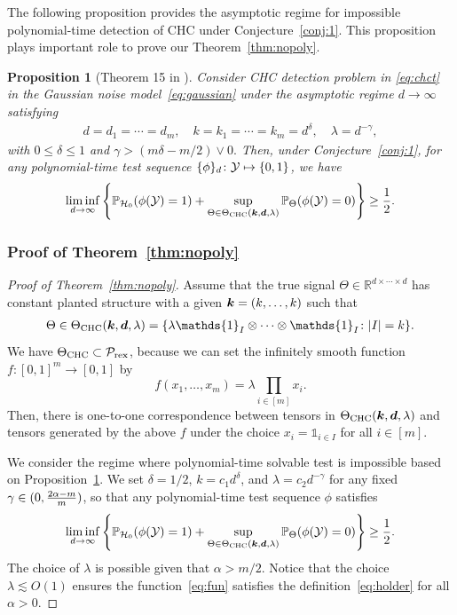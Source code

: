 \documentclass[12pt]{article}
\newtheorem{prop}{Proposition}
\theoremstyle{definition}
\begin{document}
{The following proposition provides the asymptotic regime for impossible polynomial-time detection of CHC under Conjecture~\ref{conj:1}. This proposition plays important role to prove our Theorem~\ref{thm:nopoly}.
 \begin{prop}[Theorem 15 in \citep{luo2022tensor}]\label{prop:CHC} 
Consider CHC detection problem in \eqref{eq:chct} in the Gaussian noise model~\eqref{eq:gaussian} under the asymptotic regime $d\rightarrow\infty$ satisfying
\begin{align}\label{eq:equal}
  d =  d_1= \cdots= d_m ,\quad
    k = k_1 = \cdots = k_m = d^\delta,\quad \lambda  = d^{-\gamma},
\end{align}with $0\leq\delta\leq1$ and $\gamma >(m\delta-m/2)\vee 0.$ Then, under Conjecture~\ref{conj:1}, for any polynomial-time test sequence $\{\phi\}_d\colon \mathcal{Y}\mapsto\{0,1\}$, we have
\begin{align}
    \liminf_{d\rightarrow\infty} \left\{\mathbb{P}_{\mathcal{H}_0}(\phi(\mathcal{Y}) = 1)+ \sup_{\Theta\in\Theta_{\textup{CHC}}(\bm{k},\bm{d},\lambda)}\mathbb{P}_{\Theta}(\phi(\mathcal{Y}) =0) \right\}\geq\frac{1}{2}.
\end{align}
\end{prop}
 
\subsubsection{Proof of Theorem~\ref{thm:nopoly}}
 \begin{proof}[Proof of Theorem~\ref{thm:nopoly}]
 Assume that  the true signal $\Theta\in\mathbb{R}^{d\times \cdots \times d}$ has constant planted structure with a given $\bm{k}=(k,\ldots,k)$ such that 
\begin{align}
    \Theta \in\Theta_{\text{CHC}}(\mk,\md,\lambda) = \{ \lambda \mathds{1}_{I}\otimes \cdots\otimes \mathds{1}_{I}\colon  |I| = k\}.
\end{align}
We have $\Theta_{\text{CHC}}\subset \mathcal{P}_{\textup{rex}}$, because we can set the infinitely smooth function $f: [0,1]^m \to[0,1]$ by
\begin{equation}\label{eq:fun}
f(x_1,\ldots,x_m)=\lambda \prod_{i\in[m]}x_i.
\end{equation}
Then, there is one-to-one correspondence between tensors in $\Theta_{\textup{CHC}}(\bm{k},\bm{d},\lambda)$ and tensors generated by the above $f$ under the choice $x_i=\mathds{1}_{i\in I}$ for all $i\in[m]$.


We consider the regime where polynomial-time solvable test is impossible based on Proposition~\ref{prop:CHC}. We set $\delta=1/2$, $k = c_1d^{\delta}$, and $\lambda = c_2d^{-\gamma}$ for any fixed $\gamma \in (0, {2\alpha -m \over m})$, so that any polynomial-time test sequence $\phi$ satisfies 
\[
 \liminf_{d\rightarrow\infty} \left\{\mathbb{P}_{\mathcal{H}_0}(\phi(\mathcal{Y}) = 1)+\sup_{\Theta \in \Theta_{\textup{CHC}}(\bm{k},\bm{d},\lambda)}\mathbb{P}_{\Theta}(\phi(\mathcal{Y}) =0) \right\}\geq\frac{1}{2}.
\]
The choice of $\lambda$ is possible given that $\alpha > m/2$. Notice that the choice $\lambda \lesssim O(1)$ ensures the function~\eqref{eq:fun} satisfies the definition~\eqref{eq:holder} for all $\alpha>0$. 


\end{proof}}
\end{document}
